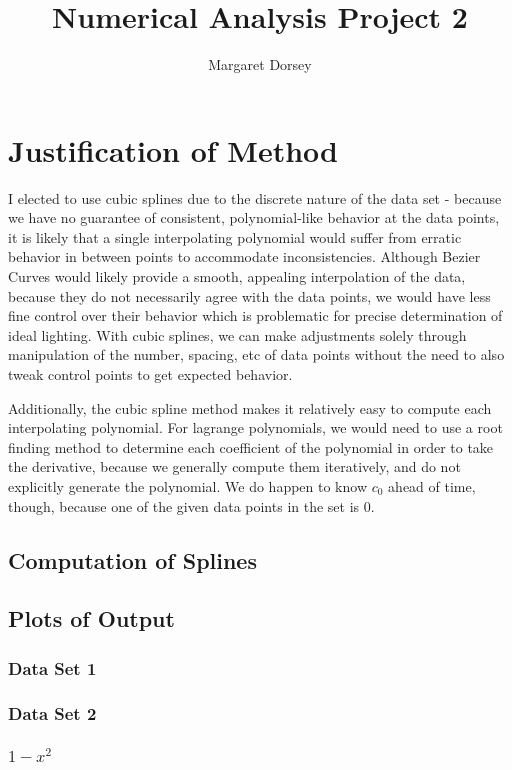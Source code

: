 \documentclass[11pt]{article} %
\title{Numerical Analysis Project 2}
\author{Margaret Dorsey}
\begin{document}
\maketitle

\section*{Justification of Method}
	I elected to use cubic splines due to the discrete nature of the data set - because we have no guarantee of consistent, polynomial-like behavior at the data points, it is likely that a single interpolating polynomial would suffer from erratic behavior in between points to accommodate inconsistencies. Although Bezier Curves would likely provide a smooth, appealing interpolation of the data, because they do not necessarily agree with the data points, we would have less fine control over their behavior which is problematic for precise determination of ideal lighting. With  cubic splines, we can make adjustments solely through manipulation of the number, spacing, etc of data points without the need to also tweak control points to get expected behavior.
\par Additionally, the cubic spline method makes it relatively easy to compute each interpolating polynomial. For lagrange polynomials, we would need to use a root finding method to determine each coefficient of the polynomial in order to take the derivative, because we generally compute them iteratively, and do not explicitly generate the polynomial. We do happen to know $c_0$ ahead of time, though, because one of the given data points in the set is $0$.

\subsection*{Computation of Splines}

\subsection*{Plots of Output}
\subsubsection*{Data Set 1}
\subsubsection*{Data Set 2}
\subsubsection*{$1-x^2$}
\end{document}
